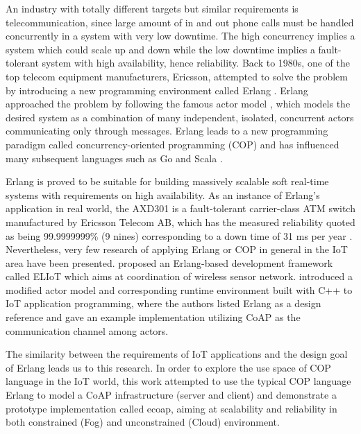 An industry with totally different targets but similar requirements is telecommunication, since large amount of in and out phone calls must be handled concurrently in a system with very low downtime. The high concurrency implies a system which could scale up and down while the low downtime implies a fault-tolerant system with high availability, hence reliability. Back to 1980s, one of the top telecom equipment manufacturers, Ericsson, attempted to solve the problem by introducing a new programming environment called Erlang \autocite{erl}. Erlang approached the problem by following the famous actor model \autocite{agha1986actors}, which models the desired system as a combination of many independent, isolated, concurrent actors communicating only through messages. Erlang leads to a new programming paradigm called concurrency-oriented programming (COP) \autocite{armstrong2003concurrency} and has influenced many subsequent languages such as Go \autocite{go} and Scala \autocite{scala}.  

Erlang is proved to be suitable for building massively scalable soft real-time systems with requirements on high availability. As an instance of Erlang's application in real world, the AXD301 is a fault-tolerant carrier-class ATM switch manufactured by Ericsson Telecom AB, which has the measured reliability quoted as being 99.9999999\% (9 nines) corresponding to a down time of 31 ms per year \autocite{armstrong2003concurrency}. Nevertheless, very few research of applying Erlang or COP in general in the IoT area have been presented. \textcite{Sivieri:2012:DPT:2667049.2667051} proposed an Erlang-based development framework called ELIoT which aims at coordination of wireless sensor network. \textcite{7034296} introduced a modified actor model and corresponding runtime environment built with C++ to IoT application programming, where the authors listed Erlang as a design reference and gave an example implementation utilizing CoAP as the communication channel among actors.  

The similarity between the requirements of IoT applications and the design goal of Erlang leads us to this research. In order to explore the use space of COP language in the IoT world, this work attempted to use the typical COP language Erlang to model a CoAP infrastructure (server and client) and demonstrate a prototype implementation called ecoap, aiming at scalability and reliability in both constrained (Fog) and unconstrained (Cloud) environment.

